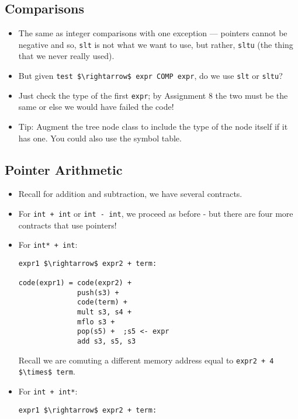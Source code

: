 \documentclass[12pt]{article}
\begin{document}
\begin{itemize}
        \subsection{Comparisons}
        \begin{itemize}
            \item The same as integer comparisons with one exception --- pointers cannot be negative and so, \lstinline[mathescape]{slt} is not what we want to use, but rather, \lstinline[mathescape]{sltu} (the thing that we never really used).
            \item But given \lstinline[mathescape]{test $\rightarrow$ expr COMP expr}, do we use \lstinline[mathescape]{slt} or \lstinline[mathescape]{sltu}?
            \item Just check the type of the first \lstinline[mathescape]{expr}; by Assignment 8 the two must be the same or else we would have failed the code!
            \item Tip: Augment the tree node class to include the type of the node itself if it has one.  You could also use the symbol table.
        \end{itemize}
       
        \subsection{Pointer Arithmetic}
        \begin{itemize}
            \item Recall for addition and subtraction, we have several contracts.
            \item For \lstinline[mathescape]{int + int} or \lstinline[mathescape]{int - int}, we proceed as before - but there are four more contracts that use pointers!
            \item For \lstinline[mathescape]{int* + int}:
\begin{lstlisting}[mathescape, numbers=none, breaklines=true]
expr1 $\rightarrow$ expr2 + term:

code(expr1) = code(expr2) +
              push(s3) +
              code(term) +
              mult s3, s4 +
              mflo s3 +
              pop(s5) +  ;s5 <- expr
              add s3, s5, s3
\end{lstlisting}
            Recall we are comuting a different memory address equal to \lstinline[mathescape]{expr2 + 4 $\times$ term}.
            \item For \lstinline[mathescape]{int + int*}:
\begin{lstlisting}[mathescape, numbers=none, breaklines=true]
expr1 $\rightarrow$ expr2 + term:


\end{lstlisting}
\end{itemize}
\end{itemize}
\end{document}
